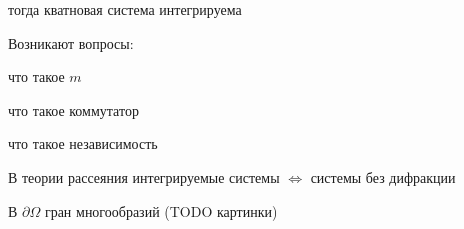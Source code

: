 тогда кватновая система интегрируема

Возникают вопросы:
\begin{enumeration}
  \item что такое $m$
  \item что такое коммутатор
  \item что такое независимость
\end{enumeration}



В теории рассеяния интегрируемые системы $\Leftrightarrow$ системы без дифракции

В $\partial\Omega$ гран многообразий
(TODO картинки)




